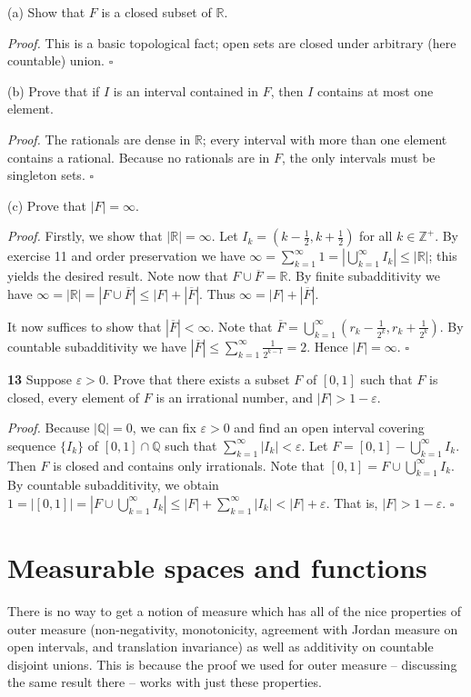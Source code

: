 \documentclass[a4paper]{article}
\newcommand{\R}{\mathbb{R}}
\newcommand{\Q}{\mathbb{Q}}
\newcommand{\Z}{\mathbb{Z}}
\begin{document}
(a) Show that $F$ is a closed subset of $\R$.

\emph{Proof.} This is a basic topological fact; open sets are closed under arbitrary (here countable) union. $\square$

(b) Prove that if $I$ is an interval contained in $F$, then $I$ contains at most one element.

\emph{Proof.} The rationals are dense in $\R$; every interval with more than one element contains a rational. Because no rationals are in $F$, the only intervals must be singleton sets. $\square$

(c) Prove that $|F| = \infty$.

\emph{Proof.} Firstly, we show that $|\R| = \infty$. Let $I_k = \left(k - \frac12, k + \frac12\right)$ for all $k \in \Z^+$. By exercise 11 and order preservation we have $\infty = \sum_{k=1}^\infty 1 = \left|\bigcup_{k=1}^\infty I_k\right| \leq |\R|$; this yields the desired result. Note now that $F \cup \overline{F} = \R$. By finite subadditivity we have $\infty = |\R| = |F \cup \overline{F}| \leq |F| + |\overline{F}|$. Thus $\infty = |F| + |\overline{F}|$.

It now suffices to show that $|\overline{F}| < \infty$. Note that $\overline{F} = \bigcup_{k=1}^\infty \left(r_k - \frac{1}{2^k}, r_k + \frac{1}{2^k}\right)$. By countable subadditivity we have $|\overline{F}| \leq \sum_{k=1}^\infty \frac{1}{2^{k-1}} = 2$. Hence $|F| = \infty$. $\square$

\textbf{13} Suppose $\varepsilon > 0$. Prove that there exists a subset $F$ of $[0, 1]$ such that $F$ is closed, every element of $F$ is an irrational number, and $|F| > 1 - \varepsilon$.

\emph{Proof.} Because $|\Q| = 0$, we can fix $\varepsilon > 0$ and find an open interval covering sequence $\{I_k\}$ of $[0, 1] \cap \Q$ such that $\sum_{k=1}^\infty |I_k| < \varepsilon$. Let $F = [0, 1] - \bigcup_{k=1}^\infty I_k$. Then $F$ is closed and contains only irrationals. Note that $[0, 1] = F \cup \bigcup_{k=1}^\infty I_k$. By countable subadditivity, we obtain $1 = |[0, 1]| = \left|F \cup \bigcup_{k=1}^\infty I_k\right| \leq |F| + \sum_{k=1}^\infty |I_k| < |F| + \varepsilon$. That is, $|F| > 1 - \varepsilon$. $\square$

\section{Measurable spaces and functions}

There is no way to get a notion of measure which has all of the nice properties of outer measure (non-negativity, monotonicity, agreement with Jordan measure on open intervals, and translation invariance) as well as additivity on countable disjoint unions. This is because the proof we used for outer measure -- discussing the same result there -- works with just these properties.
\end{document}
